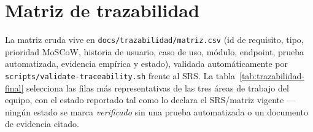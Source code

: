 \chapter{Matriz de trazabilidad}
\label{cap:trazabilidad-final}

La matriz cruda vive en \texttt{docs/trazabilidad/matriz.csv} (id de
requisito, tipo, prioridad MoSCoW, historia de usuario, caso de uso,
m\'odulo, endpoint, prueba automatizada, evidencia emp\'irica y estado),
validada autom\'aticamente por \texttt{scripts/validate-traceability.sh}
frente al SRS. La tabla~\ref{tab:trazabilidad-final} selecciona las filas
m\'as representativas de las tres \'areas de trabajo del equipo, con el
estado reportado tal como lo declara el SRS/matriz vigente --- ning\'un
estado se marca \emph{verificado} sin una prueba automatizada o un
documento de evidencia citado.

